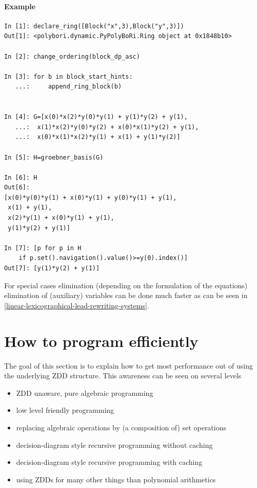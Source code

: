 \paragraph{Example} %
\label{par:example-elimination}
\begin{lstlisting}
In [1]: declare_ring([Block("x",3),Block("y",3)])
Out[1]: <polybori.dynamic.PyPolyBoRi.Ring object at 0x1848b10>

In [2]: change_ordering(block_dp_asc)

In [3]: for b in block_start_hints:
   ...:     append_ring_block(b)
     

In [4]: G=[x(0)*x(2)*y(0)*y(1) + y(1)*y(2) + y(1),
   ...:  x(1)*x(2)*y(0)*y(2) + x(0)*x(1)*y(2) + y(1),
   ...:  x(0)*x(1)*x(2)*y(1) + x(1) + y(1)*y(2)]

In [5]: H=groebner_basis(G)

In [6]: H
Out[6]: 
[x(0)*y(0)*y(1) + x(0)*y(1) + y(0)*y(1) + y(1),
 x(1) + y(1),
 x(2)*y(1) + x(0)*y(1) + y(1),
 y(1)*y(2) + y(1)]

In [7]: [p for p in H 
    if p.set().navigation().value()>=y(0).index()]
Out[7]: [y(1)*y(2) + y(1)]
\end{lstlisting}

For special cases elimination (depending on the formulation of the equations) elimination of (auxiliary) variables can be done much faster as can be seen in \ref{linear-lexicographical-lead-rewriting-systems}.



\section{How to program efficiently}
\label{sec:program-efficiently}
The goal of this section is to explain how to get most performance out of \PolyBoRi using the underlying ZDD structure.
This awareness can be seen on several levels
\begin{itemize}
    \item ZDD unaware, pure algebraic programming 
    \item low level friendly programming
    \item replacing algebraic operations by (a composition of) set operations
    \item decision-diagram style recursive programming without caching
    \item decision-diagram style recursive programming with caching
    \item using ZDDs for many other things than polynomial arithmetics
\end{itemize}
